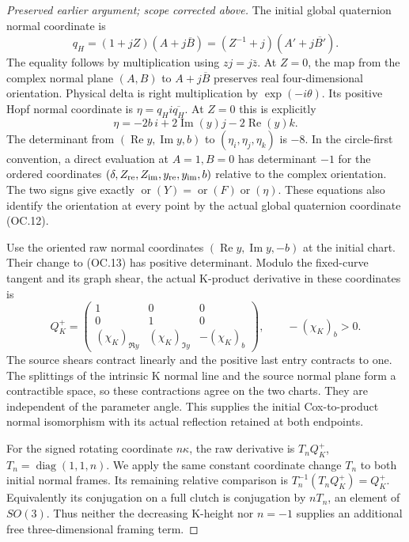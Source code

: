 \begin{proof}[Preserved earlier argument; scope corrected above]
The initial global quaternion normal coordinate is
\[
 q_H=(1+jZ)(A+j\overline B)
     =(Z^{-1}+j)(A'+j\overline {B'}).
 \tag{OC.12}
\]
The equality follows by multiplication using \(zj=j\bar z\).
At \(Z=0\), the map from the complex normal plane \((A,B)\) to
\(A+j\overline B\) preserves real four-dimensional orientation.
Physical delta is right multiplication by \(\exp(-i \theta)\). Its
positive Hopf normal coordinate is \(\eta=q_Hi\overline{q_H}\).
At \(Z=0\) this is explicitly
\[
 \eta=-2b\,i+2\operatorname{Im}(y)j-2\operatorname{Re}(y)k.
 \tag{OC.13}
\]
The determinant from \((\operatorname{Re} y,\operatorname{Im} y,b)\) to \((\eta_i,\eta_j,\eta_k)\) is \(-8\).
In the circle-first convention, a direct evaluation at \(A=1,B=0\)
has determinant \(-1\) for the ordered coordinates
\((\delta,Z_{\rm re},Z_{\rm im},y_{\rm re},y_{\rm im},b)\) relative to the complex orientation.
The two signs give exactly \(\operatorname{or}(Y)=\operatorname{or}(F)\operatorname{or}(\eta)\). These equations
also identify the orientation at every point by the actual global
quaternion coordinate (OC.12).

Use the oriented raw normal coordinates \((\operatorname{Re} y,\operatorname{Im} y,-b)\) at the
initial chart. Their change to (OC.13) has positive determinant.
Modulo the fixed-curve tangent and its graph shear, the actual
K-product derivative in these coordinates is
\[
 Q_K^+=\begin{pmatrix}
 1&0&0\\0&1&0\\
 (\chi_K)_{\Re y}&(\chi_K)_{\Im y}&-(\chi_K)_b
 \end{pmatrix},\qquad-(\chi_K)_b>0.
 \tag{OC.14}
\]
The source shears contract linearly and the positive last entry
contracts to one. The splittings of the intrinsic K normal line and
the source normal plane form a contractible space, so these
contractions agree on the two charts. They are independent of the
parameter angle. This supplies the initial Cox-to-product normal
isomorphism with its actual reflection retained at both endpoints.

For the signed rotating coordinate \(n \kappa\), the raw derivative is
\(T_n Q_K^+\), \(T_n=\operatorname{diag}(1,1,n)\). We apply the same constant coordinate
change \(T_n\) to both initial normal frames. Its remaining relative
comparison is \(T_n^{-1}(T_n Q_K^+)=Q_K^+\). Equivalently its conjugation
on a full clutch is conjugation by \(n T_n\), an element of \(SO(3)\).
Thus neither the decreasing K-height nor \(n=-1\) supplies an additional
free three-dimensional framing term.


\end{proof}
